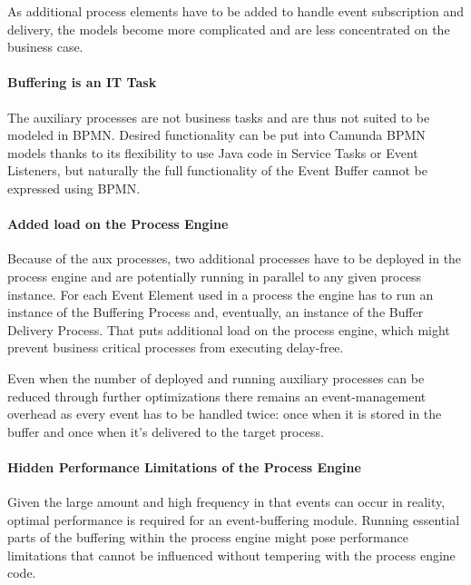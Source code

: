As additional process elements have to be added to handle event subscription and delivery, the models become more complicated and are less concentrated on the business case.

\paragraph{Buffering is an IT Task\newline}

The auxiliary processes are not business tasks and are thus not suited to be modeled in BPMN.
Desired functionality can be put into Camunda BPMN models thanks to its flexibility to use Java code in Service Tasks or Event Listeners, but naturally the full functionality of the Event Buffer cannot be expressed using BPMN.

\paragraph{Added load on the Process Engine\newline}

Because of the aux processes, two additional processes have to be deployed in the process engine and are potentially running in parallel to any given process instance. For each Event Element used in a process the engine has to run an instance of the Buffering Process and, eventually, an instance of the Buffer Delivery Process.
That puts additional load on the process engine, which might prevent business critical processes from executing delay-free.

Even when the number of deployed and running auxiliary processes can be reduced through further optimizations there remains an event-management overhead as every event has to be handled twice: once when it is stored in the buffer and once when it's delivered to the target process.

\paragraph{Hidden Performance Limitations of the Process Engine\newline}

Given the large amount and high frequency in that events can occur in reality, optimal performance is required for an event-buffering module.
Running essential parts of the buffering within the process engine might pose performance limitations that cannot be influenced without tempering with the process engine code.

\medskip \noindent
{}

